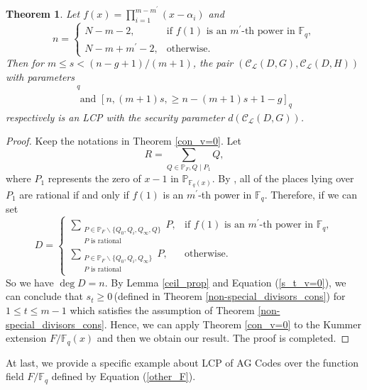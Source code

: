 \documentclass[journal,12pt,onecolumn]{IEEEtran}
\newtheorem{theorem}{Theorem}
\begin{document}
\begin{theorem}\label{LCP_w_neq0}
    Let $f(x) = \prod_{i = 1}^{m-m^\prime} (x-\alpha_i)$ and 
    \[
        n = \begin{cases}
            N - m - 2, &\text{if $f(1)$ is an $m^\prime$-th power in $\mathbb{F}_q$},\\
            N - m + m^\prime - 2 , &\text{otherwise}.
        \end{cases}
    \]Then for $m\le s <(n-g+1)/(m+1)$, the pair $(\mathcal{C}_{\mathcal{L}}(D,G),\mathcal{C}_{\mathcal{L}}(D,H))$ with parameters
        \begin{gather*}
            [n,n-(m+1)s,\ge (m+1)s+1-g]_q\\
            \text{ and }[n,(m+1)s,\ge n-(m+1)s+1-g]_q
        \end{gather*}
    respectively is an LCP with the security parameter $d(\mathcal{C}_{\mathcal{L}}(D,G))$. 
\end{theorem}
\begin{proof}
    Keep the notations in Theorem \ref{con_v=0}. Let 
    \[
        R = \sum_{Q\in\mathbb{P}_F,Q\mid P_1} Q,
    \]
    where $P_1$ represents the zero of $x-1$ in $\mathbb{P}_{\mathbb{F}_q(x)}$. By \cite[Prop. 1.4(ii)]{kawakitaKummerCurvesTheir2003a}, all of the places lying over $P_1$ are rational if and only if $f(1)$ is an $m^\prime$-th power in $\mathbb{F}_q$. Therefore, if we can set 
    \[
        D = \begin{cases}
            \sum_{\substack{P\in\mathbb{P}_{F}\backslash\{Q_0,Q_i,Q_\infty,Q\}\\  P \text{ is rational}}}P, &\text{if $f(1)$ is an $m^\prime$-th power in $\mathbb{F}_q$},\\
            \sum_{\substack{P\in\mathbb{P}_{F}\backslash\{Q_0,Q_i,Q_\infty\}\\  P \text{ is rational}}}P , &\text{otherwise}.
        \end{cases}
    \]
    So we have $\deg D = n$. By Lemma \ref{ceil_prop} and Equation (\ref{s_t_v=0}), we can conclude that $s_t\ge 0$\,(defined in Theorem \ref{non-special_divisors_cons}) for $1\le t\le m-1$ which satisfies the assumption of Theorem \ref{non-special_divisors_cons}. Hence, we can apply Theorem \ref{con_v=0} to the Kummer extension $F/\mathbb{F}_q(x)$ and then we obtain our result. The proof is completed. 
\end{proof}

At last, we provide a specific example about LCP of AG Codes over the function field $F/\mathbb{F}_q$ defined by Equation (\ref{other_F}). 
\end{document}
